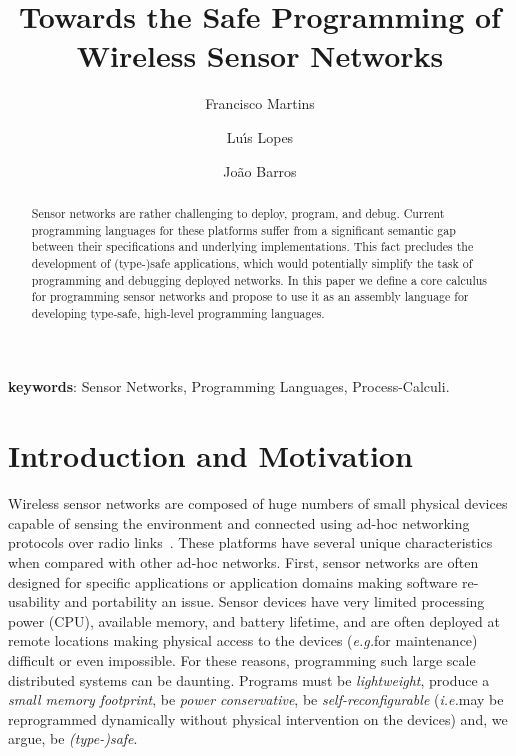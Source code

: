 \documentclass[copyright,creativecommons]{eptcs}
\def\eg{\emph{e.g.}\;}
\def\ie{\emph{i.e.}\;}
\begin{document}
\title{Towards the Safe Programming of \\ Wireless Sensor Networks}

\author{Francisco Martins
\and
Lu\'{\i}s Lopes
\and
Jo\~ao Barros
}
\maketitle
\begin{abstract}
Sensor networks are rather challenging to deploy, program, and
debug. Current programming languages for these platforms suffer from a
significant semantic gap between their specifications and underlying
implementations. This fact precludes the development of (type-)safe
applications, which would potentially simplify the task of programming and
debugging deployed networks. In this paper we define a core calculus
for programming sensor networks and propose to use it as an assembly
language for developing type-safe, high-level programming languages.
\end{abstract}


\textbf{keywords}: Sensor Networks, Programming Languages,
Process-Calculi.




\section{Introduction and Motivation}
\label{sec:introduction}

Wireless sensor networks are composed of huge numbers of small
physical devices capable of sensing the environment and connected
using ad-hoc networking protocols over radio links~\cite{survey:akyildiz:etal:02}.
These platforms have several unique characteristics when compared with
other ad-hoc networks.
First, sensor networks are often designed for specific applications or
application domains making software re-usability and portability an
issue.
Sensor devices have very limited processing power (CPU), available
memory, and battery lifetime, and are often deployed at remote
locations making physical access to the devices (\eg for maintenance)
difficult or even impossible.
For these reasons, programming such large scale distributed systems
can be daunting. Programs must be \emph{lightweight}, produce a
\emph{small memory footprint}, be \emph{power conservative}, be
\emph{self-reconfigurable} (\ie may be reprogrammed dynamically
without physical intervention on the devices) and, we argue, be
\emph{(type-)safe}.
\end{document}
